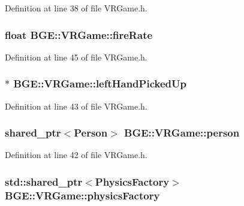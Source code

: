 Definition at line 38 of file V\-R\-Game.\-h.

\hypertarget{class_b_g_e_1_1_v_r_game_a596c5ed67ea924b37874197b96a3e445}{
\subsubsection[{fire\-Rate}]{\setlength{\rightskip}{0pt plus 5cm}float B\-G\-E\-::\-V\-R\-Game\-::fire\-Rate}}\label{class_b_g_e_1_1_v_r_game_a596c5ed67ea924b37874197b96a3e445}


Definition at line 45 of file V\-R\-Game.\-h.

\hypertarget{class_b_g_e_1_1_v_r_game_a7f3544727467ab0e3fabcca9c7a5c073}{
\subsubsection[{left\-Hand\-Picked\-Up}]{$\ast$ B\-G\-E\-::\-V\-R\-Game\-::left\-Hand\-Picked\-Up}}\label{class_b_g_e_1_1_v_r_game_a7f3544727467ab0e3fabcca9c7a5c073}


Definition at line 43 of file V\-R\-Game.\-h.

\hypertarget{class_b_g_e_1_1_v_r_game_a0a440b184bb5ae52a1d5cdab14822d9b}{
\subsubsection[{person}]{\setlength{\rightskip}{0pt plus 5cm}shared\-\_\-ptr$<${\bf Person}$>$ B\-G\-E\-::\-V\-R\-Game\-::person}}\label{class_b_g_e_1_1_v_r_game_a0a440b184bb5ae52a1d5cdab14822d9b}


Definition at line 42 of file V\-R\-Game.\-h.

\hypertarget{class_b_g_e_1_1_v_r_game_a488bfb46d4e11cf79e2822d36bc47fa0}{
\subsubsection[{physics\-Factory}]{\setlength{\rightskip}{0pt plus 5cm}std\-::shared\-\_\-ptr$<${\bf Physics\-Factory}$>$ B\-G\-E\-::\-V\-R\-Game\-::physics\-Factory}}\label{class_b_g_e_1_1_v_r_game_a488bfb46d4e11cf79e2822d36bc47fa0}


